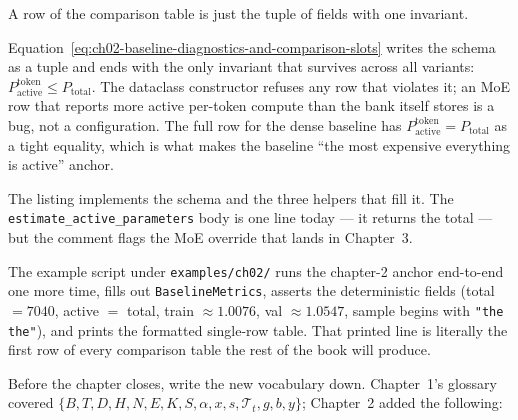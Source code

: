 A row of the comparison table is just the tuple of fields with one invariant.



Equation~\ref{eq:ch02-baseline-diagnostics-and-comparison-slots} writes the schema as a tuple and ends with the only invariant that survives across all variants: $P^{\text{token}}_{\text{active}} \le P_{\text{total}}$. The dataclass constructor refuses any row that violates it; an MoE row that reports more active per-token compute than the bank itself stores is a bug, not a configuration. The full row for the dense baseline has $P^{\text{token}}_{\text{active}} = P_{\text{total}}$ as a tight equality, which is what makes the baseline ``the most expensive everything is active'' anchor.

The listing implements the schema and the three helpers that fill it. The \texttt{estimate\_active\_parameters} body is one line today --- it returns the total --- but the comment flags the MoE override that lands in Chapter~3.



The example script under \texttt{examples/ch02/} runs the chapter-2 anchor end-to-end one more time, fills out \texttt{BaselineMetrics}, asserts the deterministic fields (total $= 7040$, active $=$ total, train $\approx 1.0076$, val $\approx 1.0547$, sample begins with \texttt{"the the"}), and prints the formatted single-row table. That printed line is literally the first row of every comparison table the rest of the book will produce.

Before the chapter closes, write the new vocabulary down. Chapter~1's glossary covered $\{B, T, D, H, N, E, K, S, \alpha, x, s, \mathcal{T}_t, g, b, y\}$; Chapter~2 added the following:

